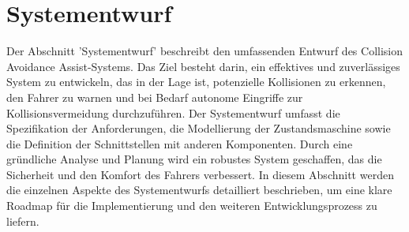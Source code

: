 \section{Systementwurf} %
Der Abschnitt 'Systementwurf' beschreibt den umfassenden Entwurf des Collision Avoidance Assist-Systems. Das Ziel besteht darin, ein effektives und zuverlässiges System zu entwickeln, das in der Lage ist, potenzielle Kollisionen zu erkennen, den Fahrer zu warnen und bei Bedarf autonome Eingriffe zur Kollisionsvermeidung durchzuführen. Der Systementwurf umfasst die Spezifikation der Anforderungen, die Modellierung der Zustandsmaschine sowie die Definition der Schnittstellen mit anderen Komponenten. Durch eine gründliche Analyse und Planung wird ein robustes System geschaffen, das die Sicherheit und den Komfort des Fahrers verbessert. In diesem Abschnitt werden die einzelnen Aspekte des Systementwurfs detailliert beschrieben, um eine klare Roadmap für die Implementierung und den weiteren Entwicklungsprozess zu liefern.
